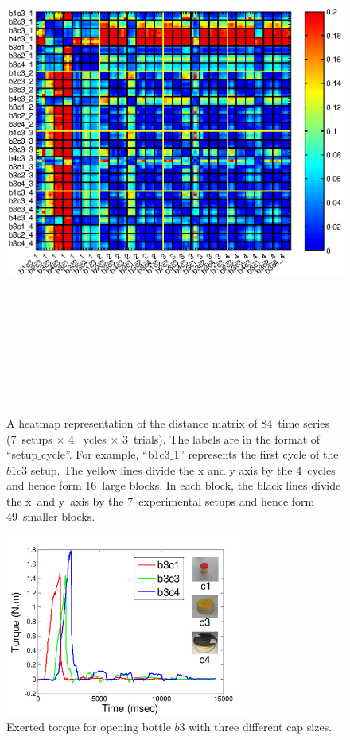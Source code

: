 \begin{figure}
\label{heatmap}
  \centering
  \includegraphics[width=18cm,height=18cm]{./fig/heatmap_all6_3.eps}
  \caption{ \scriptsize{A heatmap representation of the distance
      matrix of 84~time series (7~setups $\times$ 4 ~ycles $\times$
      3~trials). The labels are in the format of
      ``setup$\_$cycle''. For example, ``b1c3$\_$1'' represents the
      first cycle of the $b1c3$ setup. The yellow lines divide the x
      and y axis by the 4~cycles and hence form 16~large blocks. In
      each block, the black lines divide the x~and y~axis by the
      7~experimental setups and hence form 49~smaller blocks. }  }
\label{fig:heatmap}
\end{figure}

\begin{figure}
    \centering
    \includegraphics[width=8cm]{./fig/c1c3c4_time_T.pdf}
    \caption{ \scriptsize{Exerted torque for opening bottle $b3$ with three different cap sizes.}
}
\label{fig:cappatterns}
\end{figure}



